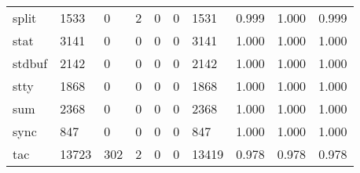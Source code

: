 \begin{longtable}{lp{1.3cm}p{1.3cm}p{1.3cm}p{1.3cm}p{1.3cm}p{1.3cm}p{1.3cm}p{1.3cm}p{1.3cm}}
split     &                   1533 &                                  0 &                                 2 &                                0 &                                 0 &                            1531 &                                   0.999 &                                  1.000 &                                0.999 \\
stat      &                   3141 &                                  0 &                                 0 &                                0 &                                 0 &                            3141 &                                   1.000 &                                  1.000 &                                1.000 \\
stdbuf    &                   2142 &                                  0 &                                 0 &                                0 &                                 0 &                            2142 &                                   1.000 &                                  1.000 &                                1.000 \\
stty      &                   1868 &                                  0 &                                 0 &                                0 &                                 0 &                            1868 &                                   1.000 &                                  1.000 &                                1.000 \\
sum       &                   2368 &                                  0 &                                 0 &                                0 &                                 0 &                            2368 &                                   1.000 &                                  1.000 &                                1.000 \\
sync      &                    847 &                                  0 &                                 0 &                                0 &                                 0 &                             847 &                                   1.000 &                                  1.000 &                                1.000 \\
tac       &                  13723 &                                302 &                                 2 &                                0 &                                 0 &                           13419 &                                   0.978 &                                  0.978 &                                0.978 \\

\end{longtable}

